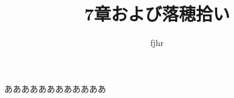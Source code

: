 \documentclass[uplatex, 10pt]{jsarticle}
\begin{document}
\title{7章および落穂拾い}
\author{fjhr}
\date{}
\maketitle

ああああああああああああ
\end{document}
